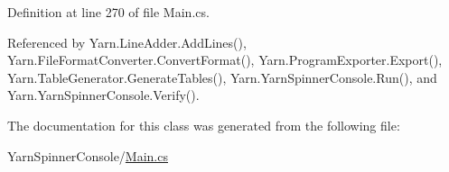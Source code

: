 Definition at line 270 of file Main.\-cs.



Referenced by Yarn.\-Line\-Adder.\-Add\-Lines(), Yarn.\-File\-Format\-Converter.\-Convert\-Format(), Yarn.\-Program\-Exporter.\-Export(), Yarn.\-Table\-Generator.\-Generate\-Tables(), Yarn.\-Yarn\-Spinner\-Console.\-Run(), and Yarn.\-Yarn\-Spinner\-Console.\-Verify().



The documentation for this class was generated from the following file\-:\begin{DoxyCompactItemize}
\item 
Yarn\-Spinner\-Console/\hyperlink{a00307}{Main.\-cs}\end{DoxyCompactItemize}
